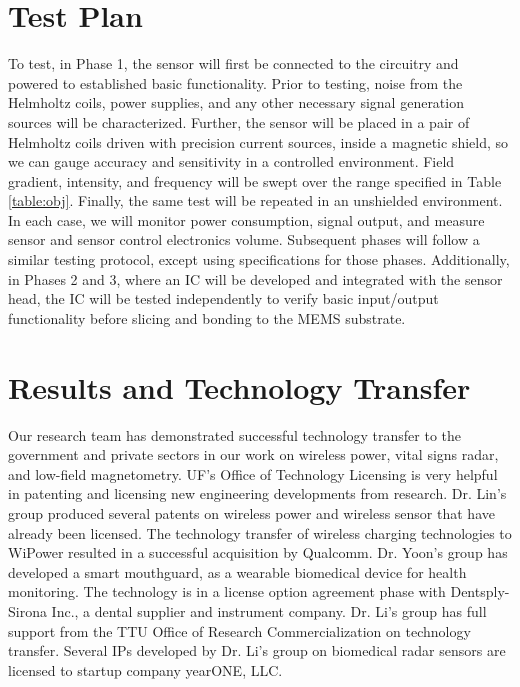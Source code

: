 \section{Test Plan}\label{sec:test}

To test, in Phase 1, the sensor will first be connected to the circuitry and powered to established basic functionality.  Prior to testing, noise from the Helmholtz coils, power supplies, and any other necessary signal generation sources will be characterized. Further, the sensor will be placed in a pair of Helmholtz coils driven with precision current sources, inside a magnetic shield, so we can gauge accuracy and sensitivity in a controlled environment. Field gradient, intensity, and frequency will be swept over the range specified in Table \ref{table:obj}. Finally, the same test will be repeated in an unshielded environment. In each case, we will monitor power consumption, signal output, and measure sensor and sensor control electronics volume. Subsequent phases will follow a similar testing protocol, except using specifications for those phases. Additionally, in Phases 2 and 3, where an IC will be developed and integrated with the sensor head, the IC will be tested independently to verify basic input/output functionality before slicing and bonding to the MEMS substrate.

\section{Results and Technology Transfer}

Our research team has demonstrated successful technology transfer to the government and private sectors in our work on wireless power, vital signs radar, and low-field magnetometry. UF's Office of Technology Licensing is very helpful in patenting and licensing new engineering developments from research. Dr. Lin's group produced several patents on wireless power and wireless sensor that have already been licensed. The technology transfer of wireless charging technologies to WiPower resulted in a successful acquisition by Qualcomm. Dr. Yoon's group has developed a smart mouthguard, as a wearable biomedical device for health monitoring. The technology is in a license option agreement phase with Dentsply-Sirona Inc., a dental supplier and instrument company. Dr. Li's group has full support from the TTU Office of Research Commercialization on technology transfer. Several IPs developed by Dr. Li's group on biomedical radar sensors are licensed to startup company yearONE, LLC.

